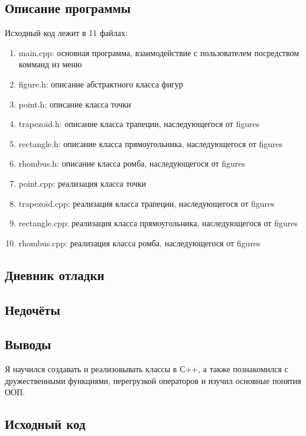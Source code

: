\documentclass[12pt]{article}
\begin{document}
\subsection*{Описание программы}

Исходный код лежит в 11 файлах:
\begin{enumerate}
\item main.cpp: основная программа, взаимодействие с пользователем посредством комманд из меню

\item figure.h:    описание абстрактного класса фигур

\item point.h:     описание класса точки
\item trapezoid.h:  описание класса трапеции, наследующегося от figures
\item rectangle.h: описание класса прямоугольника, наследующегося от figures
\item rhombus.h:    описание класса ромба, наследующегося от figures

\item point.cpp:     реализация класса точки
\item trapezoid.cpp:  реализация класса трапеции, наследующегося от figures
\item rectangle.cpp: реализация класса прямоугольника, наследующегося от figures
\item rhombus.cpp:    реализация класса ромба, наследующегося от figures

\end{enumerate}

\subsection*{Дневник отладки}


\subsection*{Недочёты}


\subsection*{Выводы}

Я научился создавать и реализовывать классы в С++, а также познакомился с дружественными функциями, перегрузкой операторов и изучил основные понятия ООП.


\vfill

\subsection*{Исходный код}
\end{document}
